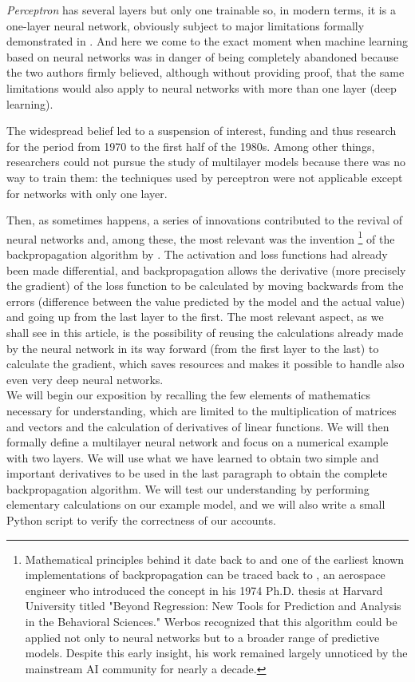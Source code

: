 \documentclass{article}
\newcommand{\authornote}{
Mathematical principles behind it date back to \textcite{kelley1960} and one of the earliest known implementations of backpropagation can be traced back to \textcite{werbos1974}, an aerospace engineer who introduced the concept in his 1974 Ph.D. thesis at Harvard University titled "Beyond Regression: New Tools for Prediction and Analysis in the Behavioral Sciences." Werbos recognized that this algorithm could be applied not only to neural networks but to a broader range of predictive models. Despite this early insight, his work remained largely unnoticed by the mainstream AI community for nearly a decade.}
\begin{document}
 \textit{Perceptron} has several layers but only one trainable so, in modern terms, it is a one-layer neural network, obviously subject to major limitations formally demonstrated in \textcite{minsky69perceptrons}. And here we come to the exact moment when machine learning based on neural networks was in danger of being completely abandoned because the two authors firmly believed, although without providing proof, that the same limitations would also apply to neural networks with more than one layer (deep learning).

 The widespread belief led to a suspension of interest, funding and thus research for the period from 1970 to the first half of the 1980s. Among other things, researchers could not pursue the study of multilayer models because there was no way to train them: the techniques used by perceptron were not applicable except for networks with only one layer.

 Then, as sometimes happens, a series of innovations contributed to the revival of neural networks and, among these, the most relevant was the invention \footnote{\authornote} of the backpropagation algorithm by \textcite{rumelhart1986}. The activation and loss functions had already been made differential, and backpropagation allows the derivative (more precisely the gradient) of the loss function to be calculated by moving backwards from the errors (difference between the value predicted by the model and the actual value) and going up from the last layer to the first. The most relevant aspect, as we shall see in this article, is the possibility of reusing the calculations already made by the neural network in its way forward (from the first layer to the last) to calculate the gradient, which saves resources and makes it possible to handle also even very deep neural networks.\\

 We will begin our exposition by recalling the few elements of mathematics necessary for understanding, which are limited to the multiplication of matrices and vectors and the calculation of derivatives of linear functions. We will then formally define a multilayer neural network and focus on a numerical example with two layers. We will use what we have learned to obtain two simple and important derivatives to be used in the last paragraph to obtain the complete backpropagation algorithm. We will test our understanding by performing elementary calculations on our example model, and we will also write a small Python script to verify the correctness of our accounts.
\end{document}
